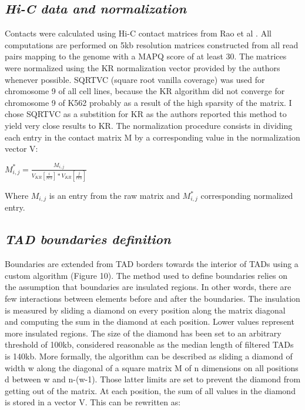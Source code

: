 \documentclass[11pt,a4paper]{report}
\begin{document}
\subsection*{\textit{Hi-C data and normalization}}

Contacts were calculated using Hi-C contact matrices from Rao et al \cite{Rao2014}. All computations are performed on 5kb resolution matrices constructed from all read pairs mapping to the genome with a MAPQ score of at least 30. The matrices were normalized using the KR normalization vector provided by the authors whenever possible. SQRTVC (square root vanilla coverage) was used for chromosome 9 of all cell lines, because the KR algorithm did not converge for chromosome 9 of K562 probably as a result of the high sparsity of the matrix. I chose SQRTVC as a substition for KR as the authors reported this method  to yield very close results to KR. 
The normalization procedure consists in dividing each entry in the contact matrix M by a corresponding value in the normalization vector V:

$M^*_{i,j}=\frac{M_{i,j}}{V_{KR}[\frac{i}{res}]*V_{KR}[\frac{j}{res}]}$

Where $M_{i,j}$ is an entry from the raw matrix and $M^*_{i,j}$ corresponding normalized entry.

\subsection*{\textit{TAD boundaries definition}}

Boundaries are extended from TAD borders towards the interior of TADs using a custom algorithm (Figure 10). The method used to define boundaries relies on the assumption that boundaries are insulated regions. In other words, there are few  interactions between elements before and after the boundaries. The insulation is measured by sliding a diamond on every position along the matrix diagonal and computing the sum in the diamond at each position. Lower values represent more insulated regions. The size of the diamond has been set to an arbitrary threshold of 100kb, considered reasonable as the median length of filtered TADs is 140kb. 
More formally, the algorithm can be described as sliding a diamond of width w  along the diagonal of a square matrix M of n dimensions on all positions d between w and n-(w-1). Those latter limits are set to prevent the diamond from getting out of the matrix. At each position, the sum of all values in the diamond is stored in a vector V. This can be rewritten as: 
\end{document}
